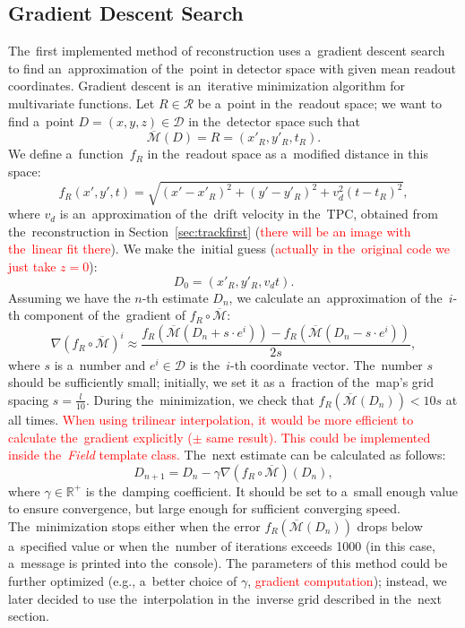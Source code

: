 		\subsection{Gradient Descent Search}
		\label{sec:grad}			
			The~first implemented method of reconstruction uses a~gradient descent search to find an~approximation of the~point in detector space with given mean readout coordinates. Gradient descent is an~iterative minimization algorithm for multivariate functions. Let $R\in\mathcal{R}$ be a~point in the~readout space; we want to find a~point $D = (x,y,z) \in\mathcal{D}$ in the~detector space such that 
				\begin{equation}
					\overbar{\mathcal{M}}(D) = R = (x'_R,y'_R,t_R).
				\end{equation}
			We define a~function~$f_R$ in the~readout space as a~modified distance in this space:
				\begin{equation}
					f_R(x',y',t) = \sqrt{(x'-x'_R)^2+(y'-y'_R)^2+v_d^2(t-t_R)^2},
				\end{equation}
			where $v_d$ is an~approximation of the~drift velocity in the~\ac{TPC}, obtained from the~reconstruction in Section~\ref{sec:trackfirst} (\textcolor{red}{there will be an image with the~linear fit there}). We make the~initial guess (\textcolor{red}{actually in the~original code we just take $z=0$}):
				\begin{equation}
					D_0 = (x'_R,y'_R,v_dt).
				\end{equation}
			Assuming we have the $n$-th estimate $D_n$, we calculate an~approximation of the~$i$-th component of the~gradient of $f_R\circ\overbar{\mathcal{M}}$:
				\begin{equation}
					\nabla(f_R\circ\overbar{\mathcal{M}})^i \approx \frac{f_R(\overbar{\mathcal{M}}(D_n+s\cdot e^i))-f_R(\overbar{\mathcal{M}}(D_n-s\cdot e^i))}{2s},
				\end{equation}
			where $s$ is a~number and $e^i\in\mathcal{D}$ is the~$i$-th coordinate vector. The~number $s$ should be sufficiently small; initially, we set it as a~fraction of the~map's grid spacing $s = \frac{l}{10}$. During the~minimization, we check that $f_R(\overbar{\mathcal{M}}(D_n))<10s$ at all times. \textcolor{red}{When using trilinear interpolation, it would be more efficient to calculate the~gradient explicitly ($\pm$ same result). This could be implemented inside the~\textit{Field} template class.} The~next estimate can be calculated as follows:
				\begin{equation}
					D_{n+1} = D_n - \gamma \nabla(f_R\circ\overbar{\mathcal{M}})(D_n),
				\end{equation}
			where $\gamma\in\mathbb{R}^+$ is the~damping coefficient. It should be set to a~small enough value to ensure convergence, but large enough for sufficient converging speed. The~minimization stops either when the error $f_R(\overbar{\mathcal{M}}(D_n))$ drops below a~specified value or when the~number of iterations exceeds 1000 (in this case, a~message is printed into the~console).
			The parameters of this method could be further optimized (e.g., a~better choice of $\gamma$, \textcolor{red}{gradient computation}); instead, we later decided to use the~interpolation in the~inverse grid described in the~next section.
			
